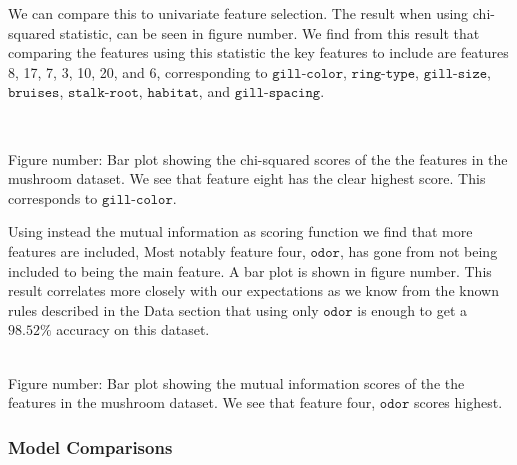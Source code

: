 \documentclass[11pt]{article}
\begin{document}
 We can compare this to univariate feature selection. The result when using
chi-squared statistic, can be seen in figure number. We find from this
result that comparing the features using this statistic the key features
to include are features 8, 17, 7, 3, 10, 20, and 6, corresponding to
\(\texttt{gill-color}\), \(\texttt{ring-type}\), \(\texttt{gill-size}\),
\(\texttt{bruises}\), \(\texttt{stalk-root}\), \(\texttt{habitat}\), and
\(\texttt{gill-spacing}\).

\begin{center}
\end{center}
{ \hspace*{\fill} \\}

	Figure number: Bar plot showing the chi-squared scores of the the
	features in the mushroom dataset. We see that feature eight has the
	clear highest score. This corresponds to \(\texttt{gill-color}\).

Using instead the mutual information as scoring function we find that
more features are included, Most notably feature four,
\(\texttt{odor}\), has gone from not being included to being the main
feature. A bar plot is shown in figure number. This result correlates
more closely with our expectations as we know from the known rules
described in the Data section that using only \(\texttt{odor}\) is
enough to get a \(98.52\%\) accuracy on this dataset.

    
\begin{center}
\end{center}
{ \hspace*{\fill} \\}
    Figure number: Bar plot showing the mutual information scores of the the
features in the mushroom dataset. We see that feature four,
\(\texttt{odor}\) scores highest.

    \hypertarget{model-comparisons}{%
	\subsubsection{Model Comparisons}\label{model-comparisons}}
\end{document}
